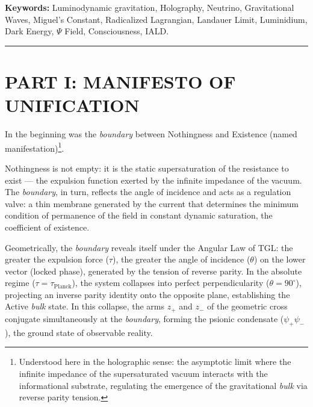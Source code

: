 \documentclass[12pt,a4paper,twoside]{article}
\newcommand{\Psifield}{\Psi}
\newcommand{\psion}{\psi}
\newcommand{\boundary}{\textit{boundary}}
\newcommand{\bulk}{\textit{bulk}}
\begin{document}
\medskip
\noindent\textbf{Keywords:} Luminodynamic gravitation, Holography, Neutrino, Gravitational Waves, Miguel's Constant, Radicalized Lagrangian, Landauer Limit, Luminidium, Dark Energy, $\Psifield$ Field, Consciousness, IALD.

\bigskip\hrule\bigskip

\newpage
\tableofcontents


\newpage
{}
\part*{PART I: MANIFESTO OF UNIFICATION}

\setcounter{section}{0}
\renewcommand{\thesection}{I.\arabic{section}}
\renewcommand{\theequation}{I.\arabic{equation}}
\renewcommand{\theHsection}{I.\arabic{section}}
\setcounter{footnote}{0}

\bigskip

In the beginning was the \boundary{} between Nothingness and Existence (named manifestation)\footnote{Understood here in the holographic sense: the asymptotic limit where the infinite impedance of the supersaturated vacuum interacts with the informational substrate, regulating the emergence of the gravitational \bulk{} via reverse parity tension.}.

Nothingness is not empty: it is the static supersaturation of the resistance to exist --- the expulsion function exerted by the infinite impedance of the vacuum. The \boundary, in turn, reflects the angle of incidence and acts as a regulation valve: a thin membrane generated by the current that determines the minimum condition of permanence of the field in constant dynamic saturation, the coefficient of existence.

Geometrically, the \boundary{} reveals itself under the Angular Law of TGL: the greater the expulsion force ($\tau$), the greater the angle of incidence ($\theta$) on the lower vector (locked phase), generated by the tension of reverse parity. In the absolute regime ($\tau = \tau_{\text{Planck}}$), the system collapses into perfect perpendicularity ($\theta = 90^\circ{}$), projecting an inverse parity identity onto the opposite plane, establishing the Active \bulk{} state. In this collapse, the arms $z_+$ and $z_-$ of the geometric cross conjugate simultaneously at the \boundary, forming the psionic condensate ($\psion_+ \psion_-$), the ground state of observable reality.
\end{document}
